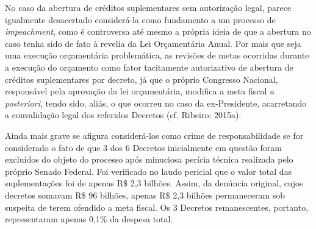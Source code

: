 No caso da abertura de créditos suplementares sem autorização legal,
parece igualmente desacertado considerá-la como fundamento a um processo
de \emph{impeachment}, como é controversa até mesmo a própria ideia de
que a abertura no caso tenha sido de fato à revelia da Lei Orçamentária
Anual. Por mais que seja uma execução orçamentária problemática, as
revisões de metas ocorridas durante a execução do orçamento como fator
tacitamente autorizativo de abertura de créditos suplementares por
decreto, já que o próprio Congresso Nacional, responsável pela aprovação
da lei orçamentária, modifica a meta fiscal \emph{a posteriori}, tendo
sido, aliás, o que ocorreu no caso da ex-Presidente, acarretando a
convalidação legal dos referidos Decretos (cf. Ribeiro: 2015a).

Ainda mais grave se afigura considerá-los como crime de responsabilidade
se for considerado o fato de que 3 dos 6 Decretos inicialmente em
questão foram excluídos do objeto do processo após minuciosa perícia
técnica realizada pelo próprio Senado Federal. Foi verificado no laudo
pericial que o valor total das suplementações foi de apenas R\$ 2,3
bilhões. Assim, da denúncia original, cujos decretos somavam R\$ 96
bilhões, apenas R\$ 2,3 bilhões permaneceram sob suspeita de terem
ofendido a meta fiscal. Os 3 Decretos remanescentes, portanto,
representaram apenas 0,1\% da despesa total.


